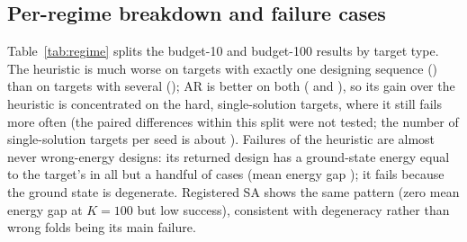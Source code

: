 \subsection*{Per-regime breakdown and failure cases}
Table~\ref{tab:regime} splits the budget-10 and budget-100 results by target type. The heuristic is much worse on targets with exactly one designing sequence () than on targets with several (); AR is better on both ( and ), so its gain over the heuristic is concentrated on the hard, single-solution targets, where it still fails more often (the paired differences within this split were not tested; the number of single-solution targets per seed is about ). Failures of the heuristic are almost never wrong-energy designs: its returned design has a ground-state energy equal to the target's in all but a handful of cases (mean energy gap ); it fails because the ground state is degenerate. Registered SA shows the same pattern (zero mean energy gap at $K=100$ but low success), consistent with degeneracy rather than wrong folds being its main failure.

\begin{table}[t]\centering\caption{Success by target type at $K=10$ and $K=100$: ``single'' targets have exactly one uniquely folding sequence, ``multi'' targets several. Mean $\pm$ std over five seeds.}\label{tab:regime}

\end{table}
